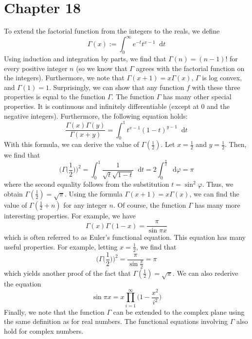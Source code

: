 \documentclass[12pt]{article}
\newcommand*\diff{\mathop{}\!\mathrm{d}}
\begin{document}
\section*{Chapter 18}
To extend the factorial function from the integers to the reals, we define
\[
\Gamma(x) := \int_0^\infty e^{-t} t^{x-1} \diff t
\] Using induction and integration by parts, we find that $\Gamma(n) = (n-1)!$ for every positive integer $n$ (so we know that $\Gamma$ agrees with the factorial function on the integers). Furthermore, we note that $\Gamma(x+1) = x\Gamma(x)$, $\Gamma$ is log convex, and $\Gamma(1) = 1$. Surprisingly, we can show that any function $f$ with these three properties is equal to the function $\Gamma$. The function $\Gamma$ has many other special properties. It is continuous and infinitely differentiable (except at $0$ and the negative integers). Furthermore, the following equation holds:
\[
\frac{\Gamma(x)\Gamma(y)}{\Gamma(x+y)} = \int_0^1 t^{x-1}(1-t)^{y-1} \diff t
\] With this formula, we can derive the value of $\Gamma(\frac{1}{2})$. Let $x = \frac{1}{2}$ and $y = \frac{1}{2}$. Then, we find that
\[
\bigg(\Gamma\bigg(\frac{1}{2}\bigg)\bigg)^2 = \int_0^1 \frac{1}{\sqrt{t}{\sqrt{1-t}}} \diff t = 2 \int_0^{\frac{\pi}{2}} \diff \varphi = \pi
\] where the second equality follows from the substitution $t = \sin^2 \varphi$. Thus, we obtain $\Gamma(\frac{1}{2}) = \sqrt{\pi}$. Using the formula $\Gamma(x+1) = x\Gamma(x)$, we can find the value of $\Gamma(\frac{1}{2}+n)$ for any integer $n$. Of course, the function $\Gamma$ has many more interesting properties. For example, we have
\[
\Gamma(x)\Gamma(1-x) = \frac{\pi}{\sin \pi x}
\] which is often referred to as Euler's functional equation. This equation has many useful properties. For example, letting $x = \frac{1}{2}$, we find that
\[
\bigg(\Gamma\bigg(\frac{1}{2}\bigg)\bigg)^2 = \frac{\pi}{\sin \frac{\pi}{2}} = \pi
\] which yields another proof of the fact that $\Gamma(\frac{1}{2}) = \sqrt{\pi}$. We can also rederive the equation
\[
\sin \pi x = x \prod_{i=1}^\infty \bigg(1 - \frac{x^2}{i^2}\bigg)
\]
 Finally, we note that the function $\Gamma$ can be extended to the complex plane using the same definition as for real numbers. The functional equations involving $\Gamma$ also hold for complex numbers.
\end{document}
